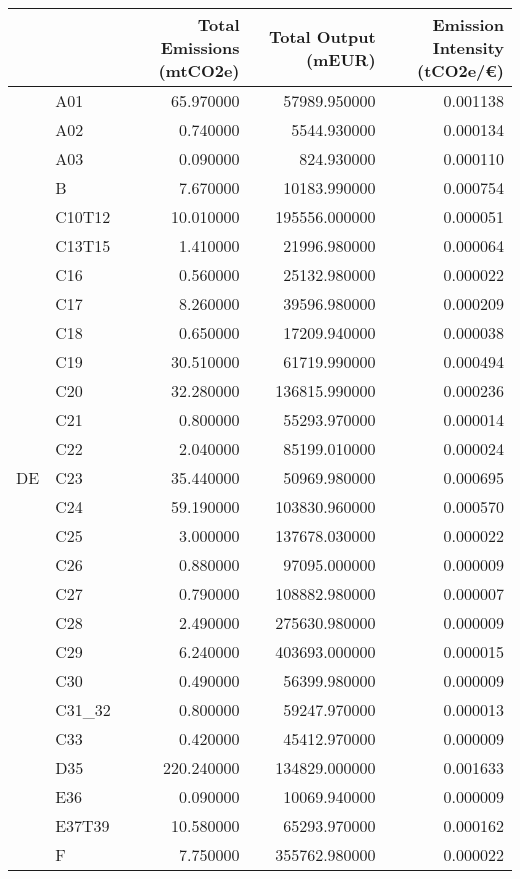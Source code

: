 \begin{tabular}{llrrr}
\toprule
 &  & Total Emissions (mtCO2e) & Total Output (mEUR) & Emission Intensity (tCO2e/€) \\
\midrule
\multirow[t]{64}{*}{DE} & A01 & 65.970000 & 57989.950000 & 0.001138 \\
 & A02 & 0.740000 & 5544.930000 & 0.000134 \\
 & A03 & 0.090000 & 824.930000 & 0.000110 \\
 & B & 7.670000 & 10183.990000 & 0.000754 \\
 & C10T12 & 10.010000 & 195556.000000 & 0.000051 \\
 & C13T15 & 1.410000 & 21996.980000 & 0.000064 \\
 & C16 & 0.560000 & 25132.980000 & 0.000022 \\
 & C17 & 8.260000 & 39596.980000 & 0.000209 \\
 & C18 & 0.650000 & 17209.940000 & 0.000038 \\
 & C19 & 30.510000 & 61719.990000 & 0.000494 \\
 & C20 & 32.280000 & 136815.990000 & 0.000236 \\
 & C21 & 0.800000 & 55293.970000 & 0.000014 \\
 & C22 & 2.040000 & 85199.010000 & 0.000024 \\
 & C23 & 35.440000 & 50969.980000 & 0.000695 \\
 & C24 & 59.190000 & 103830.960000 & 0.000570 \\
 & C25 & 3.000000 & 137678.030000 & 0.000022 \\
 & C26 & 0.880000 & 97095.000000 & 0.000009 \\
 & C27 & 0.790000 & 108882.980000 & 0.000007 \\
 & C28 & 2.490000 & 275630.980000 & 0.000009 \\
 & C29 & 6.240000 & 403693.000000 & 0.000015 \\
 & C30 & 0.490000 & 56399.980000 & 0.000009 \\
 & C31\_32 & 0.800000 & 59247.970000 & 0.000013 \\
 & C33 & 0.420000 & 45412.970000 & 0.000009 \\
 & D35 & 220.240000 & 134829.000000 & 0.001633 \\
 & E36 & 0.090000 & 10069.940000 & 0.000009 \\
 & E37T39 & 10.580000 & 65293.970000 & 0.000162 \\
 & F & 7.750000 & 355762.980000 & 0.000022 \\

\end{tabular}
